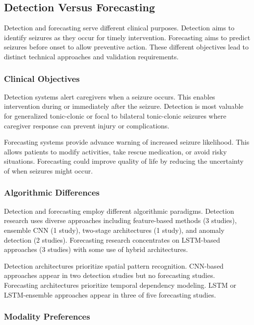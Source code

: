 \subsection{Detection Versus Forecasting}

Detection and forecasting serve different clinical purposes. Detection aims to identify seizures as they occur for timely intervention. Forecasting aims to predict seizures before onset to allow preventive action. These different objectives lead to distinct technical approaches and validation requirements.

\subsubsection{Clinical Objectives}

Detection systems alert caregivers when a seizure occurs. This enables intervention during or immediately after the seizure. Detection is most valuable for generalized tonic-clonic or focal to bilateral tonic-clonic seizures where caregiver response can prevent injury or complications.

Forecasting systems provide advance warning of increased seizure likelihood. This allows patients to modify activities, take rescue medication, or avoid risky situations. Forecasting could improve quality of life by reducing the uncertainty of when seizures might occur.

\subsubsection{Algorithmic Differences}

Detection and forecasting employ different algorithmic paradigms. Detection research uses diverse approaches including feature-based methods (3 studies), ensemble CNN (1 study), two-stage architectures (1 study), and anomaly detection (2 studies). Forecasting research concentrates on LSTM-based approaches (3 studies) with some use of hybrid architectures.

Detection architectures prioritize spatial pattern recognition. CNN-based approaches appear in two detection studies but no forecasting studies. Forecasting architectures prioritize temporal dependency modeling. LSTM or LSTM-ensemble approaches appear in three of five forecasting studies.

\subsubsection{Modality Preferences}

